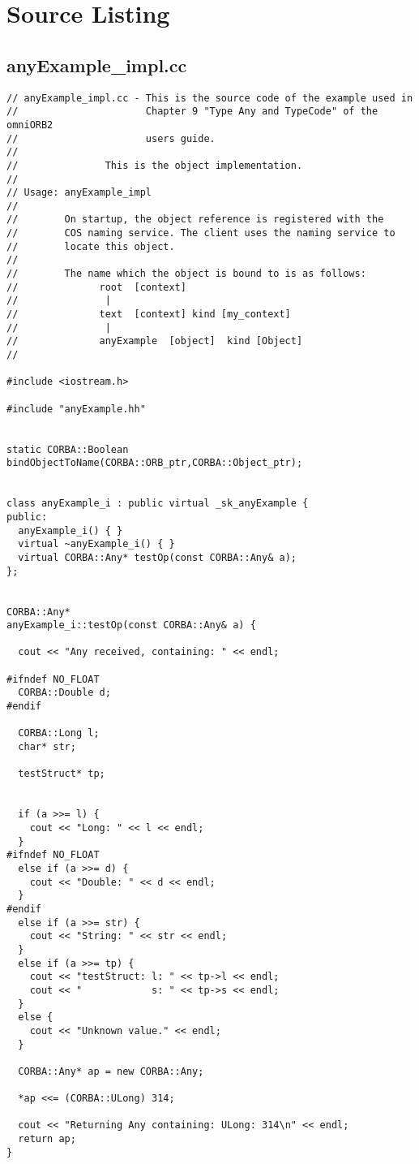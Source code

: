 \documentclass[11pt,twoside,onecolumn]{book}
\begin{document}
\section{Source Listing}
{\small
\subsection{anyExample\_impl.cc}
\begin{verbatim}
// anyExample_impl.cc - This is the source code of the example used in 
//                      Chapter 9 "Type Any and TypeCode" of the omniORB2 
//                      users guide.
//
//               This is the object implementation.
//
// Usage: anyExample_impl
//
//        On startup, the object reference is registered with the 
//        COS naming service. The client uses the naming service to
//        locate this object.
//
//        The name which the object is bound to is as follows:
//              root  [context]
//               |
//              text  [context] kind [my_context]
//               |
//              anyExample  [object]  kind [Object]
//

#include <iostream.h>

#include "anyExample.hh"


static CORBA::Boolean bindObjectToName(CORBA::ORB_ptr,CORBA::Object_ptr);


class anyExample_i : public virtual _sk_anyExample {
public:
  anyExample_i() { }
  virtual ~anyExample_i() { }
  virtual CORBA::Any* testOp(const CORBA::Any& a);
};


CORBA::Any* 
anyExample_i::testOp(const CORBA::Any& a) {

  cout << "Any received, containing: " << endl;
  
#ifndef NO_FLOAT
  CORBA::Double d;
#endif

  CORBA::Long l;
  char* str;

  testStruct* tp;


  if (a >>= l) {
    cout << "Long: " << l << endl;
  }
#ifndef NO_FLOAT
  else if (a >>= d) {
    cout << "Double: " << d << endl;
  }
#endif
  else if (a >>= str) {
    cout << "String: " << str << endl;
  }
  else if (a >>= tp) {
    cout << "testStruct: l: " << tp->l << endl;
    cout << "            s: " << tp->s << endl;
  }
  else {
    cout << "Unknown value." << endl;
  }

  CORBA::Any* ap = new CORBA::Any;
  
  *ap <<= (CORBA::ULong) 314;

  cout << "Returning Any containing: ULong: 314\n" << endl;
  return ap;
}



\end{verbatim}}
\end{document}
